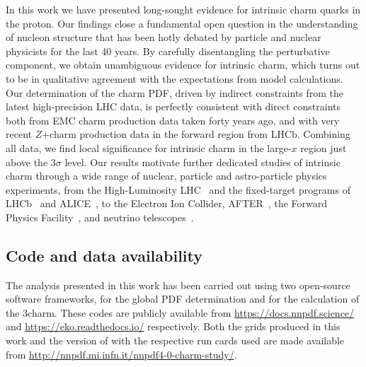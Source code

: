 
In this work we have presented long-sought evidence for intrinsic charm quarks
in the proton.
%
Our findings close a fundamental open question in the understanding of nucleon
structure that has been hotly debated by particle and nuclear physicists for
the last 40 years.
%
By carefully disentangling the perturbative component, we obtain unambiguous
evidence for intrinsic charm, which turns out to be in qualitative agreement
with the expectations from model calculations.
%
Our determination of the charm PDF, driven by indirect constraints from the 
latest high-precision LHC data, is perfectly consistent with direct constraints
both from EMC charm production data taken forty years   ago, and with very
recent  $Z$+charm production data in the forward region from LHCb.
%
Combining all data, we find local significance for intrinsic charm in the
large-$x$ region just above the $3\sigma$ level.
%
Our results motivate further dedicated studies of intrinsic charm through a
wide range of nuclear, particle and astro-particle physics experiments, from
the High-Luminosity LHC~\cite{Azzi:2019yne} and the fixed-target programs of
LHCb~\cite{LHCb:2018jry} and ALICE~\cite{QCDWorkingGroup:2019dyv}, to the  
Electron Ion Collider, AFTER~\cite{Hadjidakis:2018ifr}, the Forward Physics
Facility~\cite{Anchordoqui:2021ghd}, and neutrino
telescopes~\cite{Halzen:2016thi}.

\subsection*{Code and data availability}

The analysis presented in this work has been carried out using two open-source
software frameworks,  for the global PDF determination and \eko for
the calculation of the 3\fns charm.
%
These codes are publicly available from \url{https://docs.nnpdf.science/} and
\url{https://eko.readthedocs.io/} respectively.
%
Both the \lhapdf grids produced in this work and the version of \eko with the
respective run cards used are made available from
\url{http://nnpdf.mi.infn.it/nnpdf4-0-charm-study/}.
